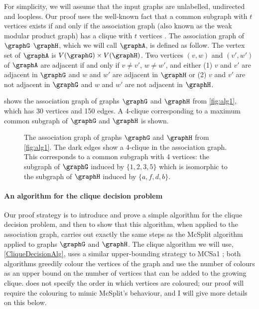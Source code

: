 For simplicity, we will assume that the input graphs are unlabelled,
undirected and loopless.
Our proof uses the well-known fact that a common subgraph with $t$ vertices exists
if and only if the association graph (also known as the weak modular product graph)
has a clique with $t$ vertices \cite{LeviG}.  The association graph of $\graphG$ 
$\graphH$, which we will
call $\graphA$, is defined as follow.  The vertex set of $\graphA$ is
$V(\graphG) \times V(\graphH)$.  Two vertices $(v,w)$ and $(v',w')$ of $\graphA$
are adjacent if and only if $v \not= v'$, $w \not= w'$, and either (1) $v$ and $v'$
are adjacent in $\graphG$ and $w$ and $w'$ are adjacent in $\graphH$ or (2) $v$ and $v'$
are not adjacent in $\graphG$ and $w$ and $w'$ are not adjacent in $\graphH$.

 shows the association graph of graphs $\graphG$ and $\graphH$
from \cref{fig:alg1}, which has 30 vertices and 150 edges.  A 4-clique corresponding to
a maximum common subgraph of $\graphG$ and $\graphH$ is shown.

\begin{figure}[htb]
\centering
\caption{The association graph of graphs $\graphG$ and $\graphH$ from \cref{fig:alg1}.  The dark edges
    show a 4-clique in
    the association graph. This corresponds to a common subgraph with 4 vertices: the subgraph of $\graphG$ induced by
    $\{1,2,3,5\}$ which is isomorphic to the subgraph of $\graphH$ induced by $\{a,f,d,b\}$.}
\label{fig:association-graph}
\end{figure}

\paragraph{An algorithm for the clique decision problem}
Our proof strategy is to introduce and prove a simple algorithm for the clique
decision problem, and then to show that this algorithm, when applied to the association
graph, carries out exactly the same steps as the McSplit algorithm applied to graphs
$\graphG$ and $\graphH$.  The clique algorithm we will use, \cref{CliqueDecisionAlg},
uses a similar upper-bounding strategy to MCSa1 \cite{DBLP:journals/algorithms/Prosser12,DBLP:journals/ieicet/TomitaSHW13};
both algorithms greedily colour the vertices of the graph and use the number of colours
as an upper bound on the number of vertices that can be added to the growing clique.
 does not specify the order in which vertices are coloured;
our proof will require the colouring to mimic McSplit's behaviour, and I will give
more details on this below.

